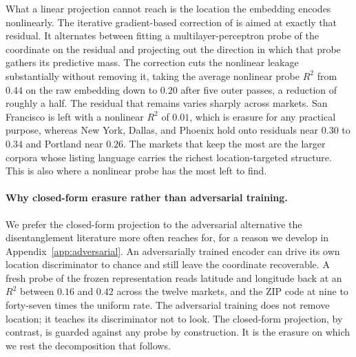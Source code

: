 What a linear projection cannot reach is the location the embedding encodes
nonlinearly. The iterative gradient-based correction of
\citet{iskander2023shielded} is aimed at exactly that residual. It alternates between fitting
a multilayer-perceptron probe of the coordinate on the residual and projecting out
the direction in which that probe gathers its predictive mass. The correction cuts
the nonlinear leakage substantially without removing it, taking the average
nonlinear probe $R^2$ from $0.44$ on the raw embedding down to $0.20$ after five
outer passes, a reduction of roughly a half. The residual that remains
varies sharply across markets. San Francisco is left with a nonlinear $R^2$ of
$0.01$, which is erasure for any practical purpose, whereas New York, Dallas, and
Phoenix hold onto residuals near $0.30$ to $0.34$ and Portland near $0.26$. The
markets that keep the most are the larger corpora whose listing language
carries the richest location-targeted structure. This is also where a nonlinear
probe has the most left to find.

\paragraph{Why closed-form erasure rather than adversarial training.} We prefer
the closed-form projection to the adversarial alternative the disentanglement
literature more often reaches for, for a reason we develop in
Appendix~\ref{app:adversarial}. An adversarially trained encoder can drive its own
location discriminator to chance and still leave the coordinate recoverable. A
fresh probe of the frozen representation reads latitude and longitude back at an
$R^2$ between $0.16$ and $0.42$ across the twelve markets, and the ZIP code at nine
to forty-seven times the uniform rate. The adversarial training does not remove
location; it teaches its discriminator not to look. The closed-form projection, by
contrast, is guarded against any probe by construction. It is the erasure on
which we rest the decomposition that follows.

